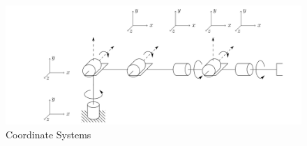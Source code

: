 \documentclass[12pt]{report}
\begin{document}
\newpage


\begin{figure}[htp]
  \centering
  \includegraphics[width=.9\textwidth]{zero}
  \caption{Coordinate Systems}
  \label{fig:coords}
\end{figure}


\end{document}
